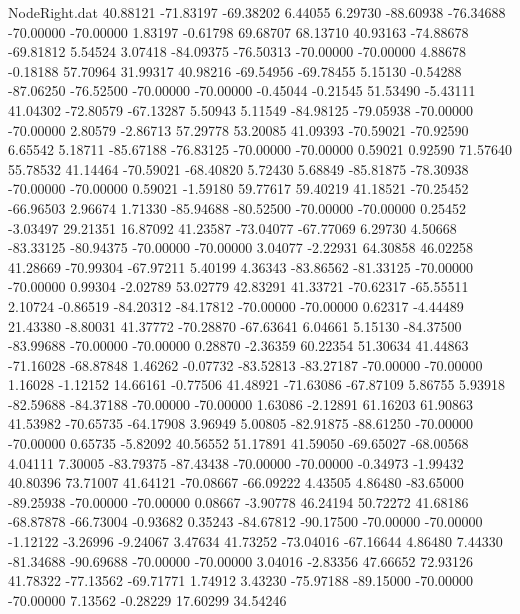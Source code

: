 \begin{filecontents}{NodeRight.dat}
  40.88121  -71.83197  -69.38202     6.44055    6.29730  -88.60938  -76.34688  -70.00000  -70.00000    1.83197   -0.61798   69.68707   68.13710
  40.93163  -74.88678  -69.81812     5.54524    3.07418  -84.09375  -76.50313  -70.00000  -70.00000    4.88678   -0.18188   57.70964   31.99317
  40.98216  -69.54956  -69.78455     5.15130   -0.54288  -87.06250  -76.52500  -70.00000  -70.00000   -0.45044   -0.21545   51.53490   -5.43111
  41.04302  -72.80579  -67.13287     5.50943    5.11549  -84.98125  -79.05938  -70.00000  -70.00000    2.80579   -2.86713   57.29778   53.20085
  41.09393  -70.59021  -70.92590     6.65542    5.18711  -85.67188  -76.83125  -70.00000  -70.00000    0.59021    0.92590   71.57640   55.78532
  41.14464  -70.59021  -68.40820     5.72430    5.68849  -85.81875  -78.30938  -70.00000  -70.00000    0.59021   -1.59180   59.77617   59.40219
  41.18521  -70.25452  -66.96503     2.96674    1.71330  -85.94688  -80.52500  -70.00000  -70.00000    0.25452   -3.03497   29.21351   16.87092
  41.23587  -73.04077  -67.77069     6.29730    4.50668  -83.33125  -80.94375  -70.00000  -70.00000    3.04077   -2.22931   64.30858   46.02258
  41.28669  -70.99304  -67.97211     5.40199    4.36343  -83.86562  -81.33125  -70.00000  -70.00000    0.99304   -2.02789   53.02779   42.83291
  41.33721  -70.62317  -65.55511     2.10724   -0.86519  -84.20312  -84.17812  -70.00000  -70.00000    0.62317   -4.44489   21.43380   -8.80031
  41.37772  -70.28870  -67.63641     6.04661    5.15130  -84.37500  -83.99688  -70.00000  -70.00000    0.28870   -2.36359   60.22354   51.30634
  41.44863  -71.16028  -68.87848     1.46262   -0.07732  -83.52813  -83.27187  -70.00000  -70.00000    1.16028   -1.12152   14.66161   -0.77506
  41.48921  -71.63086  -67.87109     5.86755    5.93918  -82.59688  -84.37188  -70.00000  -70.00000    1.63086   -2.12891   61.16203   61.90863
  41.53982  -70.65735  -64.17908     3.96949    5.00805  -82.91875  -88.61250  -70.00000  -70.00000    0.65735   -5.82092   40.56552   51.17891
  41.59050  -69.65027  -68.00568     4.04111    7.30005  -83.79375  -87.43438  -70.00000  -70.00000   -0.34973   -1.99432   40.80396   73.71007
  41.64121  -70.08667  -66.09222     4.43505    4.86480  -83.65000  -89.25938  -70.00000  -70.00000    0.08667   -3.90778   46.24194   50.72272
  41.68186  -68.87878  -66.73004    -0.93682    0.35243  -84.67812  -90.17500  -70.00000  -70.00000   -1.12122   -3.26996   -9.24067    3.47634
  41.73252  -73.04016  -67.16644     4.86480    7.44330  -81.34688  -90.69688  -70.00000  -70.00000    3.04016   -2.83356   47.66652   72.93126
  41.78322  -77.13562  -69.71771     1.74912    3.43230  -75.97188  -89.15000  -70.00000  -70.00000    7.13562   -0.28229   17.60299   34.54246

\end{filecontents}
